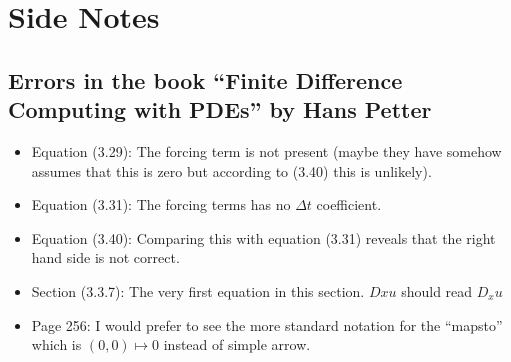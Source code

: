\chapter{Side Notes}

\section{Errors in the book ``Finite Difference Computing with PDEs'' by Hans Petter}
\begin{itemize}[noitemsep]
	\item Equation (3.29): The forcing term is not present (maybe they have somehow assumes that this is zero but according to (3.40) this is unlikely).
	\item Equation (3.31): The forcing terms has no $ \Delta t $ coefficient.
	\item Equation (3.40): Comparing this with equation (3.31) reveals that the right hand side is not correct.
	\item Section (3.3.7): The very first equation in this section. $ Dxu $ should read $ D_x u $
	\item Page 256: I would prefer to see the more standard notation for the ``mapsto'' which is $ (0,0) \mapsto 0 $ instead of simple arrow.
	
\end{itemize}
